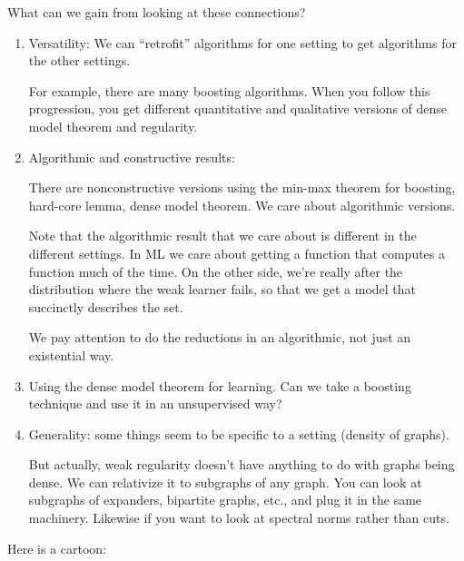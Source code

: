 What can we gain from looking at these connections?
\begin{enumerate}
\item
Versatility: We can ``retrofit'' algorithms for one setting to get algorithms for the other settings.

For example, there are many boosting algorithms. When you follow this progression, you get different quantitative and qualitative versions of dense model theorem and regularity.
\item
Algorithmic and constructive results: 

There are nonconstructive versions using the min-max theorem for boosting, hard-core lemma, dense model theorem. We care about algorithmic versions. 

Note that the algorithmic result that we care about is different in the different settings.  In ML we care about getting a function that computes a function much of the time. On the other side, we're really after the distribution where the weak learner fails, so that we get a model that succinctly describes the set. 

We pay attention to do the reductions in an algorithmic, not just an existential way.
\item
Using the dense model theorem for learning. Can we take a boosting technique and use it in an unsupervised way?
\item
Generality: some things seem to be specific to a setting (density of graphs). 

But actually, weak regularity doesn't have anything to do with graphs being dense. We can relativize it to subgraphs of any graph. You can look at subgraphs of expanders, bipartite graphs, etc., and plug it in the same machinery. Likewise if you want to look at spectral norms rather than cuts.
\end{enumerate}


Here is a cartoon:

